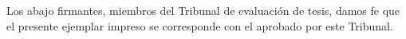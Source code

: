 Los abajo firmantes, miembros del Tribunal de evaluación de tesis, damos fe que el presente
ejemplar impreso se corresponde con el aprobado por este Tribunal.

